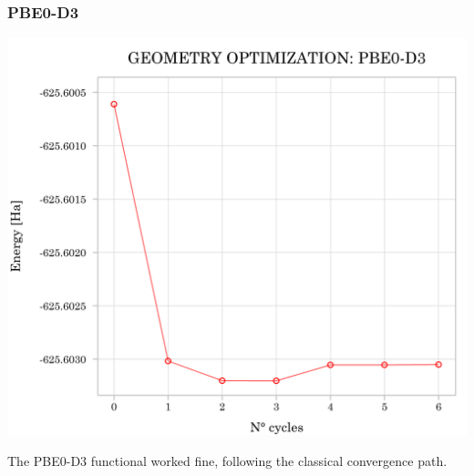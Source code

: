 \documentclass{article}
\begin{document}
\subsubsection{PBE0-D3}
\noindent\begin{minipage}[t]{0.55\textwidth}
	\vspace{-\topskip}
	\includegraphics[width=1\textwidth]{../images/PBE0.png}
	\label{fig:opt_PBE0}
\end{minipage}
\hfill
\begin{minipage}[t]{0.4\textwidth}
	\vspace{-\topskip}
	\vspace{20pt}
	The PBE0-D3 functional worked fine, following the classical convergence path.
\end{minipage}
\end{document}

